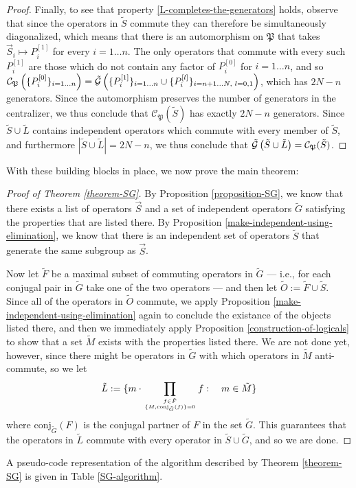 \documentclass[twocolumn,showpacs,preprintnumbers,amsmath,amssymb,nofootinbib,pra,floatfix]{revtex4-1}
\newenvironment{remark}[1][Remark]{\begin{trivlist}
\item[\hskip \labelsep {\bfseries #1}]}{\end{trivlist}}
\newcommand{\lst}{\vec}
\newcommand{\set}{\tilde}
\newcommand{\genfun}{\tilde{\mathcal{G}}}
\newcommand{\pauligroup}{\mathfrak{P}}
\newcommand{\centralizer}{\mathcal{C}}
\begin{document}
\begin{proof}
Finally, to see that property \ref{L-completes-the-generators} holds, observe that since the operators in $\set S$ commute they can therefore be simultaneously diagonalized, which means that there is an automorphism on $\pauligroup$ that takes $\lst S_i\mapsto P_i^{[1]}$ for every $i=1 \dots n$.  The only operators that commute with every such $P_i^{[1]}$ are those which do not contain any factor of $P_i^{[0]}$ for $i=1 \dots n$, and so $\centralizer_\pauligroup\paren{\{P_i^{[0]}\}_{i=1\dots n}} = \genfun\paren{\{P_i^{[1]}\}_{i=1 \dots n}\cup \{P_i^{[l]}\}_{i=n+1 \dots N, \,\, l=0,1}}$, which has $2N-n$ generators.  Since the automorphism preserves the number of generators in the centralizer, we thus conclude that $\centralizer_\pauligroup(\set S)$ has exactly $2N-n$ generators.  Since $\set S\cup\set L$ contains independent operators which commute with every member of $\set S$, and furthermore $|\set S\cup\set L|=2N-n$, we thus conclude that $\genfun\paren{\set S\cup\set L}=\centralizer_\pauligroup(\set S)$.
\end{proof}
With these building blocks in place, we now prove the main theorem:

\begin{proof}[Proof of Theorem \ref{theorem-SG}]
By Proposition \ref{proposition-SG}, we know that there exists a list of operators $\lst S$ and a set of independent operators $\set G$ satisfying the properties that are listed there.  By Proposition \ref{make-independent-using-elimination}, we know that there is an independent set of operators $\set S$ that generate the same subgroup as $\lst S$.  

Now let $\set F$ be a maximal subset of commuting operators in $\set G$ --- i.e., for each conjugal pair in $\set G$ take one of the two operators --- and then let $\set O := \set F \cup \set S$.  Since all of the operators in $\set O$ commute, we apply Proposition \ref{make-independent-using-elimination} again to conclude the existance of the objects listed there, and then we immediately apply Proposition \ref{construction-of-logicals} to show that a set $\set M$ exists with the properties listed there.  We are not done yet, however, since there might be operators in $\set G$ with which operators in $\set M$ anti-commute, so we let
$$\set L := \{m\cdot\prod_{f\in \set F\atop \{M,\text{conj}_{\set G}(f)\}=0} f :\quad m \in\set M\}$$
where $\text{conj}_{\set G}(F)$ is the conjugal partner of $F$ in the set $\set G$.  This guarantees that the operators in $\set L$ commute with every operator in $\set S\cup\set G$, and so we are done.
\end{proof}
\begin{remark}
A pseudo-code representation of the algorithm described by Theorem \ref{theorem-SG} is given in Table \ref{SG-algorithm}.
\end{remark}
\end{document}
